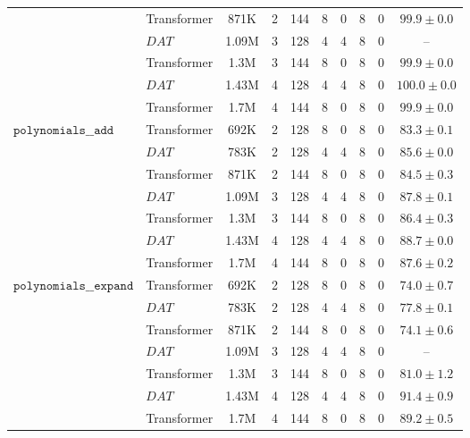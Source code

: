 \begin{tabular}{l|l|ccccccc|c}
                                 & Transformer & 871K & 2 & 144 & 8 & 0 & 8 & 0 &   $99.9 \pm 0.0$ \\
                                 & $DAT$ & 1.09M & 3 & 128 & 4 & 4 & 8 & 0 &               -- \\
                                 & Transformer & 1.3M & 3 & 144 & 8 & 0 & 8 & 0 &   $99.9 \pm 0.0$ \\
                                 & $DAT$ & 1.43M & 4 & 128 & 4 & 4 & 8 & 0 &  $100.0 \pm 0.0$ \\
                                 & Transformer & 1.7M & 4 & 144 & 8 & 0 & 8 & 0 &   $99.9 \pm 0.0$ \\
\cline{1-10}
\multirow{7}{*}{$\texttt{polynomials\_\_add}$} & Transformer & 692K & 2 & 128 & 8 & 0 & 8 & 0 &   $83.3 \pm 0.1$ \\
                                 & $DAT$ & 783K & 2 & 128 & 4 & 4 & 8 & 0 &   $85.6 \pm 0.0$ \\
                                 & Transformer & 871K & 2 & 144 & 8 & 0 & 8 & 0 &   $84.5 \pm 0.3$ \\
                                 & $DAT$ & 1.09M & 3 & 128 & 4 & 4 & 8 & 0 &   $87.8 \pm 0.1$ \\
                                 & Transformer & 1.3M & 3 & 144 & 8 & 0 & 8 & 0 &   $86.4 \pm 0.3$ \\
                                 & $DAT$ & 1.43M & 4 & 128 & 4 & 4 & 8 & 0 &   $88.7 \pm 0.0$ \\
                                 & Transformer & 1.7M & 4 & 144 & 8 & 0 & 8 & 0 &   $87.6 \pm 0.2$ \\
\cline{1-10}
\multirow{7}{*}{$\texttt{polynomials\_\_expand}$} & Transformer & 692K & 2 & 128 & 8 & 0 & 8 & 0 &   $74.0 \pm 0.7$ \\
                                 & $DAT$ & 783K & 2 & 128 & 4 & 4 & 8 & 0 &   $77.8 \pm 0.1$ \\
                                 & Transformer & 871K & 2 & 144 & 8 & 0 & 8 & 0 &   $74.1 \pm 0.6$ \\
                                 & $DAT$ & 1.09M & 3 & 128 & 4 & 4 & 8 & 0 &               -- \\
                                 & Transformer & 1.3M & 3 & 144 & 8 & 0 & 8 & 0 &   $81.0 \pm 1.2$ \\
                                 & $DAT$ & 1.43M & 4 & 128 & 4 & 4 & 8 & 0 &   $91.4 \pm 0.9$ \\
                                 & Transformer & 1.7M & 4 & 144 & 8 & 0 & 8 & 0 &   $89.2 \pm 0.5$ \\
\bottomrule
\end{tabular}
